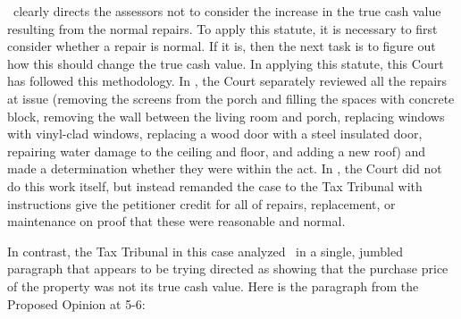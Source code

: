 \documentclass[12pt,\documentclassflag]{michiganCourtOfAppealsBrief}
\def\mathieuGast{\pincite[l]{MCL}{211.27(2)}}
\begin{document}
\mathieuGast\ clearly directs the assessors not to consider the increase in the true cash value resulting from the normal repairs. To apply this statute, it is necessary to first consider whether a repair is normal. If it is, then the next task is to figure out how this should change the true cash value. In applying this statute, this Court has followed this methodology. In \cite{Coyne}, the Court separately reviewed all the repairs at issue (removing the screens from the porch and filling the spaces with concrete block, removing the wall between the living room and porch, replacing windows with vinyl-clad windows, replacing a wood door with a steel insulated door, repairing water damage to the ceiling and floor, and adding a new roof) and made a determination whether they were within the act. In \cite{Fisher}, the Court did not do this work itself, but instead remanded the case to the Tax Tribunal with instructions give the petitioner credit for all of repairs, replacement, or maintenance on proof that these were reasonable and normal.

In contrast, the Tax Tribunal in this case analyzed \mathieuGast\ in a single, jumbled paragraph that appears to be trying directed as showing that the purchase price of the property was not its true cash value. Here is the paragraph from the Proposed Opinion at 5-6:
\end{document}
